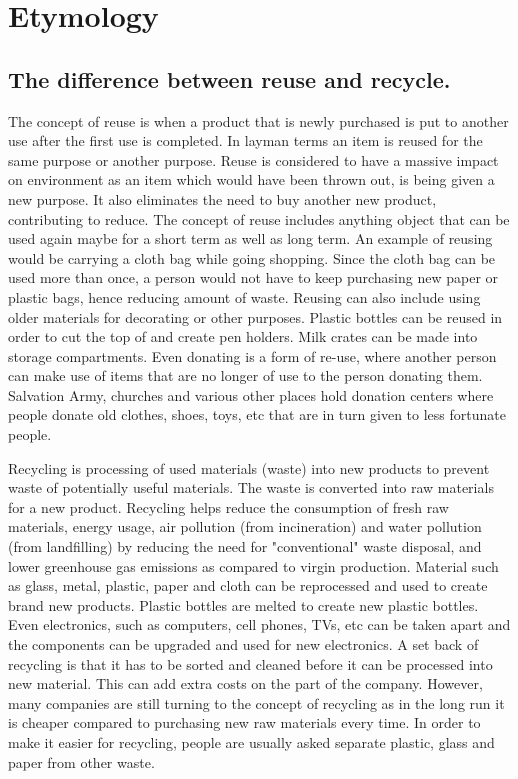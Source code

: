 \documentclass{article}
\begin{document}
\section{Etymology}
\subsection{The difference between reuse and recycle.}
The concept of reuse is when a product that is newly purchased is put to another use after the first use is completed. In layman terms an item is reused for the same purpose or another purpose. Reuse is considered to have a massive impact on environment as an item which would have been thrown out, is being given a new purpose. It also eliminates the need to buy another new product, contributing to reduce. The concept of reuse includes anything object that can be used again maybe for a short term as well as long term. An example of reusing would be carrying a cloth bag while going shopping. Since the cloth bag can be used more than once, a person would not have to keep purchasing new paper or plastic bags, hence reducing amount of waste. Reusing can also include using older materials for decorating or other purposes. Plastic bottles can be reused in order to cut the top of and create pen holders. Milk crates can be made into storage compartments. Even donating is a form of re-use, where another person can make use of items that are no longer of use to the person donating them. Salvation Army, churches and various other places hold donation centers where people donate old clothes, shoes, toys, etc that are in turn given to less fortunate people.

Recycling is processing of used materials (waste) into new products to prevent waste of potentially useful materials. The waste is converted into raw materials for a new product. Recycling helps reduce the consumption of fresh raw materials, energy usage, air pollution (from incineration) and water pollution (from landfilling) by reducing the need for "conventional" waste disposal, and lower greenhouse gas emissions as compared to virgin production. Material such as glass, metal, plastic, paper and cloth can be reprocessed and used to create brand new products. Plastic bottles are melted to create new plastic bottles. Even electronics, such as computers, cell phones, TVs, etc can be taken apart and the components can be upgraded and used for new electronics. A set back of recycling is that it has to be sorted and cleaned before it can be processed into new material. This can add extra costs on the part of the company. However, many companies are still turning to the concept of recycling as in the long run it is cheaper compared to purchasing new raw materials every time. In order to make it easier for recycling, people are usually asked separate plastic, glass and paper from other waste.
\end{document}
